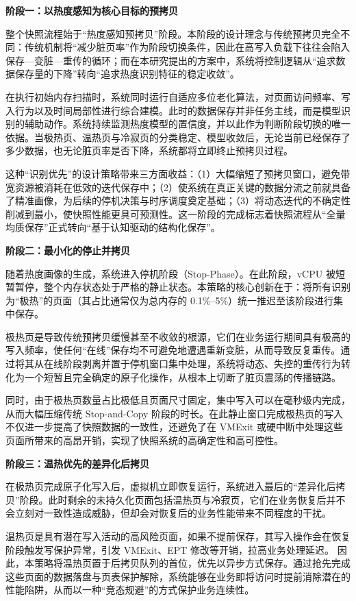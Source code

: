 \textbf{阶段一：以热度感知为核心目标的预拷贝}

整个快照流程始于“热度感知预拷贝”阶段。本阶段的设计理念与传统预拷贝完全不同：传统机制将“减少脏页率”作为阶段切换条件，因此在高写入负载下往往会陷入保存—变脏—重传的循环；而在本研究提出的方案中，系统将控制逻辑从“追求数据保存量的下降”转向“追求热度识别特征的稳定收敛”。

在执行初始内存扫描时，系统同时运行自适应多位老化算法，对页面访问频率、写入行为以及时间局部性进行综合建模。此时的数据保存并非任务主线，而是模型识别的辅助动作。系统持续监测热度模型的置信度，并以此作为判断阶段切换的唯一依据。当极热页、温热页与冷寂页的分类稳定、模型收敛后，无论当前已经保存了多少数据，也无论脏页率是否下降，系统都将立即终止预拷贝过程。

这种“识别优先”的设计策略带来三方面收益：（1）大幅缩短了预拷贝窗口，避免带宽资源被消耗在低效的迭代保存中；（2）使系统在真正关键的数据分流之前就具备了精准画像，为后续的停机决策与时序调度奠定基础；（3）将动态迭代的不确定性削减到最小，使快照性能更具可预测性。这一阶段的完成标志着快照流程从“全量均质保存”正式转向“基于认知驱动的结构化保存”。

\textbf{阶段二：最小化的停止并拷贝}

随着热度画像的生成，系统进入停机阶段（Stop-Phase）。在此阶段，vCPU 被短暂暂停，整个内存状态处于严格的静止状态。本策略的核心创新在于：将所有识别为“极热”的页面（其占比通常仅为总内存的 0.1\%–5\%）统一推迟至该阶段进行集中保存。

极热页是导致传统预拷贝缓慢甚至不收敛的根源，它们在业务运行期间具有极高的写入频率，使任何“在线”保存均不可避免地遭遇重新变脏，从而导致反复重传。通过将其从在线阶段剥离并置于停机窗口集中处理，系统将动态、失控的重传行为转化为一个短暂且完全确定的原子化操作，从根本上切断了脏页震荡的传播链路\cite{liu2011performance, wu2016hot}。


同时，由于极热页数量占比极低且页面尺寸固定，集中写入可以在毫秒级内完成，从而大幅压缩传统 Stop-and-Copy 阶段的时长。在此静止窗口完成极热页的写入不仅进一步提高了快照数据的一致性，还避免了在 VMExit 或硬中断中处理这些页面所带来的高昂开销，实现了快照系统的高确定性和高可控性。

\textbf{阶段三：温热优先的差异化后拷贝}

在极热页完成原子化写入后，虚拟机立即恢复运行，系统进入最后的“差异化后拷贝”阶段。此时剩余的未持久化页面包括温热页与冷寂页，它们在业务恢复后并不会立刻对一致性造成威胁，但却会对恢复后的业务性能带来不同程度的干扰。

温热页是具有潜在写入活动的高风险页面，如果不提前保存，其写入操作会在恢复阶段触发写保护异常，引发 VMExit、EPT 修改等开销，拉高业务处理延迟\cite{xu2015vmexit, uhlig2005intel}。
因此，本策略将温热页置于后拷贝队列的首位，优先以异步方式保存。通过抢先完成这些页面的数据落盘与页表保护解除，系统能够在业务即将访问时提前消除潜在的性能陷阱，从而以一种“竞态规避”的方式保护业务连续性。

